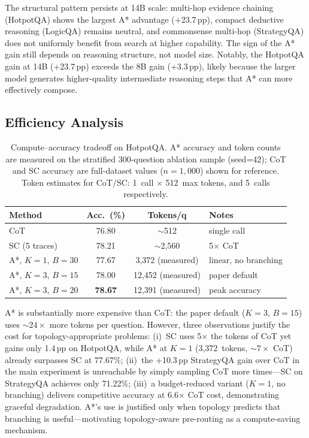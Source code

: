 \documentclass{article}
\newcommand{\pp}{\,pp\xspace}
\begin{document}
The structural pattern persists at 14B scale: multi-hop evidence chaining
(HotpotQA) shows the largest A* advantage (+23.7\pp), compact deductive
reasoning (LogicQA) remains neutral, and commonsense multi-hop (StrategyQA)
does not uniformly benefit from search at higher capability.  The sign of the
A* gain still depends on reasoning structure, not model size.  Notably, the
HotpotQA gain at 14B (+23.7\pp) exceeds the 8B gain (+3.3\pp), likely because
the larger model generates higher-quality intermediate reasoning steps that A*
can more effectively compose.

\subsection{Efficiency Analysis}
\label{sec:efficiency}

\begin{table}[t]
\centering
\caption{Compute--accuracy tradeoff on HotpotQA.  A* accuracy and token
counts are measured on the stratified 300-question ablation sample (seed=42);
CoT and SC accuracy are full-dataset values ($n{=}1{,}000$) shown for
reference.  Token estimates for CoT/SC: 1~call $\times$ 512~max tokens, and
5~calls respectively.}
\label{tab:efficiency}
\small
\begin{tabular}{@{}lccl@{}}
\toprule
\textbf{Method} & \textbf{Acc.\ (\%)} & \textbf{Tokens/q} & \textbf{Notes} \\
\midrule
CoT             & 76.80 & ${\sim}$512     & single call \\
SC (5 traces)   & 78.21 & ${\sim}$2,560   & 5$\times$ CoT \\
A*, $K{=}1$, $B{=}30$ & 77.67 & 3,372 (measured) & linear, no branching \\
A*, $K{=}3$, $B{=}15$ & 78.00 & 12,452 (measured) & paper default \\
A*, $K{=}3$, $B{=}20$ & \textbf{78.67} & 12,391 (measured) & peak accuracy \\
\bottomrule
\end{tabular}
\end{table}

A* is substantially more expensive than CoT: the paper default ($K{=}3$,
$B{=}15$) uses ${\sim}24\times$ more tokens per question.  However, three
observations justify the cost for topology-appropriate problems: (i)~SC uses
5$\times$ the tokens of CoT yet gains only 1.4\pp on HotpotQA, while A* at
$K{=}1$ (3,372~tokens, ${\sim}7\times$ CoT) already surpasses SC at 77.67\%;
(ii)~the +10.3\pp StrategyQA gain over CoT in the main experiment is
unreachable by simply sampling CoT more times---SC on StrategyQA achieves only
71.22\%; (iii)~a budget-reduced variant ($K{=}1$, no branching) delivers
competitive accuracy at 6.6$\times$ CoT cost, demonstrating graceful
degradation.  A*'s use is justified only when topology predicts that branching
is useful---motivating topology-aware pre-routing as a compute-saving
mechanism.
\end{document}
